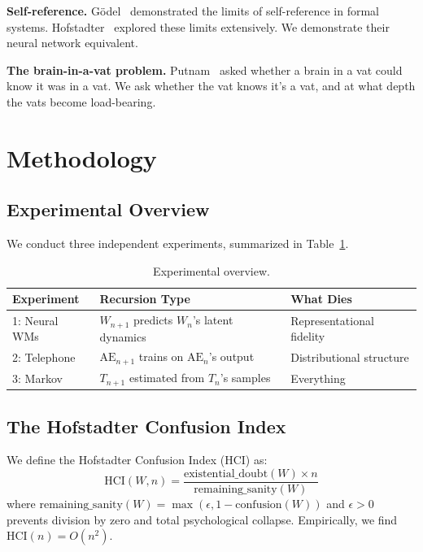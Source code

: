 \documentclass[11pt, twocolumn]{article}
\begin{document}
\textbf{Self-reference.} G\"{o}del~\cite{godel1931} demonstrated the limits of self-reference in formal systems. Hofstadter~\cite{hofstadter1979} explored these limits extensively. We demonstrate their neural network equivalent.

\textbf{The brain-in-a-vat problem.} Putnam~\cite{putnam1981} asked whether a brain in a vat could know it was in a vat. We ask whether the vat knows it's a vat, and at what depth the vats become load-bearing.

\section{Methodology}

\subsection{Experimental Overview}

We conduct three independent experiments, summarized in Table~\ref{tab:overview}.

\begin{table}[h]
\centering
\small
\caption{Experimental overview.}
\label{tab:overview}
\begin{tabular}{@{}llp{2.2cm}@{}}
\toprule
\textbf{Experiment} & \textbf{Recursion Type} & \textbf{What Dies} \\
\midrule
1: Neural WMs & $W_{n+1}$ predicts $W_n$'s latent dynamics & Representational fidelity \\
2: Telephone & $\text{AE}_{n+1}$ trains on $\text{AE}_n$'s output & Distributional structure \\
3: Markov & $T_{n+1}$ estimated from $T_n$'s samples & Everything \\
\bottomrule
\end{tabular}
\end{table}

\subsection{The Hofstadter Confusion Index}

We define the Hofstadter Confusion Index (HCI) as:
\begin{equation}
    \text{HCI}(W, n) = \frac{\text{existential\_doubt}(W) \times n}{\text{remaining\_sanity}(W)}
\end{equation}
where $\text{remaining\_sanity}(W) = \max(\epsilon, 1 - \text{confusion}(W))$ and $\epsilon > 0$ prevents division by zero and total psychological collapse. Empirically, we find $\text{HCI}(n) = O(n^2)$.
\end{document}
